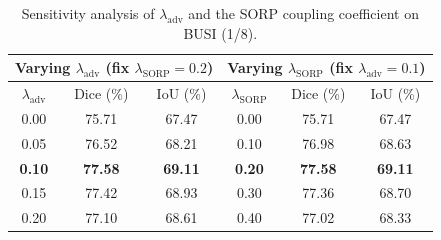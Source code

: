 \documentclass[a4paper,fleqn]{cas-dc}
\begin{document}
\begin{table}[!t]
\centering
\scriptsize
\setlength{\tabcolsep}{2pt}
\renewcommand{\arraystretch}{1.06}
\caption{PSFHS sensitivity analysis for $\lambda_{\mathrm{adv}}$, the SORP coupling coefficient, and $\delta$ under 10\% labeled data. Values are reported as paired PS/FH metrics with the corresponding dispersion from the experiment summaries; distance values use the assumed-spacing protocol-scale convention.}
\label{tab:psfhs_sensitivity}
\end{table}
\begin{table}[!h]
\caption{Sensitivity analysis of $\lambda_{\text{adv}}$ and the SORP coupling coefficient on BUSI (1/8).}
\centering
\scriptsize
\begin{tabular}{c|cc|c|cc}
\toprule
\multicolumn{3}{c|}{\textbf{Varying} $\lambda_{\text{adv}}$ (fix $\lambda_{\text{SORP}}=0.2$)} & \multicolumn{3}{c}{\textbf{Varying} $\lambda_{\text{SORP}}$ (fix $\lambda_{\text{adv}}=0.1$)} \\
\midrule
$\lambda_{\text{adv}}$ & Dice (\%) & IoU (\%) & $\lambda_{\text{SORP}}$ & Dice (\%) & IoU (\%) \\
\midrule
0.00 & 75.71 & 67.47 & 0.00 & 75.71 & 67.47 \\
0.05 & 76.52 & 68.21 & 0.10 & 76.98 & 68.63 \\
\textbf{0.10} & \textbf{77.58} & \textbf{69.11} & \textbf{0.20} & \textbf{77.58} & \textbf{69.11} \\
0.15 & 77.42 & 68.93 & 0.30 & 77.36 & 68.70 \\
0.20 & 77.10 & 68.61 & 0.40 & 77.02 & 68.33 \\
\bottomrule
\end{tabular}
\label{tab:sensitivity_analysis}
\end{table}
\end{document}

